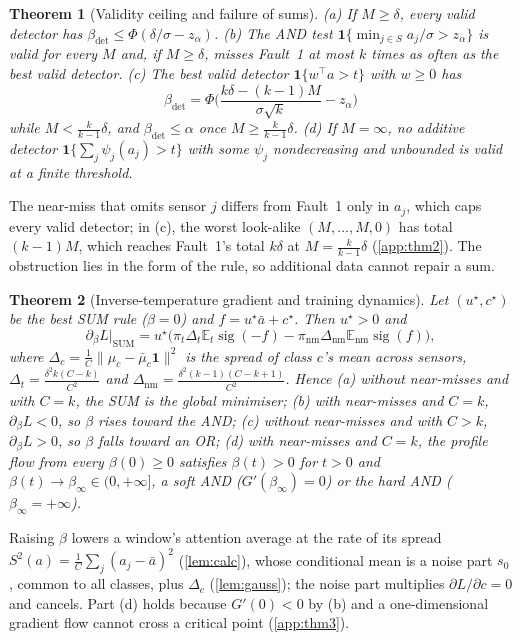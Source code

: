 \documentclass{article}
\theoremstyle{plain}
\newtheorem{theorem}{Theorem}
\theoremstyle{definition}
\theoremstyle{remark}
\newcommand{\E}{\mathbb{E}}
\newcommand{\one}{\mathbf{1}}
\newcommand{\sig}{\operatorname{sig}}
\newcommand{\nm}{\mathrm{nm}}
\newcommand{\bdet}{\beta_{\mathrm{det}}}
\begin{document}
\begin{theorem}[Validity ceiling and failure of sums]\label{thm:and}
(a) If $M\ge\delta$, every valid detector has $\bdet\le\Phi(\delta/\sigma-z_\alpha)$. (b) The AND test $\one\{\min_{j\in S}a_j/\sigma>z_\alpha\}$ \citep{berger1982} is valid for every $M$ and, if $M\ge\delta$, misses Fault~1 at most $k$ times as often as the best valid detector. (c) The best valid detector $\one\{w^\top a>t\}$ with $w\ge0$ has
\[
  \bdet=\Phi\Big(\frac{k\delta-(k-1)M}{\sigma\sqrt k}-z_\alpha\Big)
\]
while $M<\frac{k}{k-1}\delta$, and $\bdet\le\alpha$ once $M\ge\frac{k}{k-1}\delta$. (d) If $M=\infty$, no additive detector $\one\{\sum_j\psi_j(a_j)>t\}$ with some $\psi_j$ nondecreasing and unbounded is valid at a finite threshold.
\end{theorem}

The near-miss that omits sensor $j$ differs from Fault~1 only in $a_j$, which caps every valid detector; in (c), the worst look-alike $(M,\dots,M,0)$ has total $(k-1)M$, which reaches Fault~1's total $k\delta$ at $M=\frac{k}{k-1}\delta$ (\cref{app:thm2}). The obstruction lies in the form of the rule, so additional data cannot repair a sum.

\begin{theorem}[Inverse-temperature gradient and training dynamics]\label{thm:attn}
Let $(u^\star,c^\star)$ be the best SUM rule ($\beta=0$) and $f=u^\star\bar a+c^\star$. Then $u^\star>0$ and
\[
  \partial_\beta L\big|_{\text{SUM}}
  =u^\star\big(\pi_t\Delta_t\E_t\sig(-f)-\pi_\nm\Delta_\nm\E_\nm\sig(f)\big),
\]
where $\Delta_c=\frac1C\|\mu_c-\bar\mu_c\one\|^2$ is the spread of class $c$'s mean across sensors, $\Delta_t=\frac{\delta^2k(C-k)}{C^2}$ and $\Delta_\nm=\frac{\delta^2(k-1)(C-k+1)}{C^2}$. Hence
(a) without near-misses and with $C=k$, the SUM is the global minimiser;
(b) with near-misses and $C=k$, $\partial_\beta L<0$, so $\beta$ rises toward the AND;
(c) without near-misses and with $C>k$, $\partial_\beta L>0$, so $\beta$ falls toward an OR;
(d) with near-misses and $C=k$, the profile flow from every $\beta(0)\ge0$ satisfies $\beta(t)>0$ for $t>0$ and $\beta(t)\to\beta_\infty\in(0,+\infty]$, a soft AND ($G'(\beta_\infty)=0$) or the hard AND ($\beta_\infty=+\infty$).
\end{theorem}

Raising $\beta$ lowers a window's attention average at the rate of its spread $S^2(a)=\frac1C\sum_j(a_j-\bar a)^2$ (\cref{lem:calc}), whose conditional mean is a noise part $s_0$, common to all classes, plus $\Delta_c$ (\cref{lem:gauss}); the noise part multiplies $\partial L/\partial c=0$ and cancels. Part (d) holds because $G'(0)<0$ by (b) and a one-dimensional gradient flow cannot cross a critical point (\cref{app:thm3}).
\end{document}

